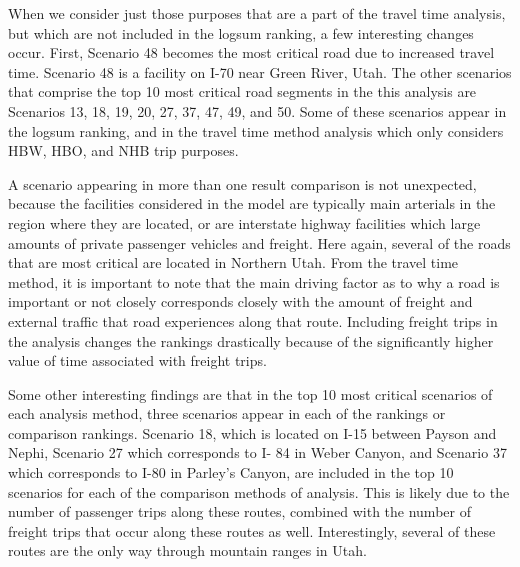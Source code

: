 When we consider just those purposes that are a part of the travel time analysis,
but which are not included in the logsum ranking, a few interesting changes occur.
First, Scenario 48 becomes the most critical road due to increased travel time.
Scenario 48 is a facility on I-70 near Green River, Utah.
The other scenarios that comprise the top 10 most critical road segments
in the this analysis are Scenarios 13, 18, 19, 20, 27, 37, 47, 49, and 50. Some
of these scenarios appear in the logsum ranking, and in the travel time method
analysis which only considers HBW, HBO, and NHB trip purposes.

A scenario appearing in more than one result comparison is not unexpected,
because the facilities considered in the model are typically main
arterials in the region where they are located, or are interstate highway
facilities which large amounts of private passenger vehicles and freight.
Here again, several of the roads that are most critical are located in
Northern Utah. From the travel time method, it is important to note that the main driving factor as to
why a road is important or not closely corresponds closely with
the amount of
freight and external traffic that road experiences along that route. Including freight
trips in the analysis changes the rankings
drastically because of the significantly higher value of time associated
with freight trips.

Some other interesting findings are that in the top 10 most critical scenarios of each analysis
method, three scenarios appear in each of the rankings or comparison rankings. Scenario 18, which is located on
I-15 between Payson and Nephi, Scenario 27 which corresponds to I-
84 in Weber Canyon, and Scenario 37 which corresponds to I-80 in Parley’s Canyon,
are included in the
top 10 scenarios for each of the comparison methods of analysis. This is likely due to the
number of passenger trips along these routes, combined with the number of freight
trips that occur along these routes as well. Interestingly, several of these routes are
the only way through mountain ranges in Utah.

